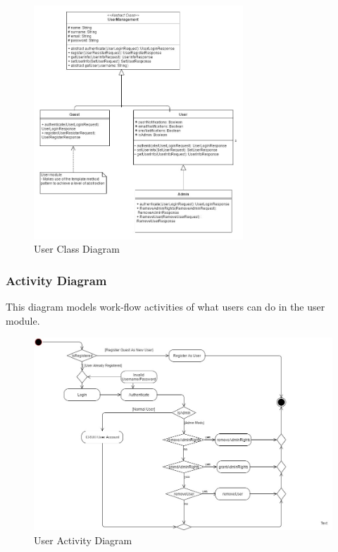 \begin{figure}[H]
	\centering
	\includegraphics[width=0.7\textwidth]{user/img/UserClassDiagram.jpg}
	\caption{User Class Diagram}
\end{figure}



%
%
%
\pagebreak
\subsubsection{Activity Diagram}
This diagram models work-flow activities of what users can do in the user module.

\begin{figure}[H]
		\centering
		\includegraphics[width=\textwidth]{user/img/UserActivityDiagram.jpg}
		\caption{User Activity Diagram}
\end{figure}


